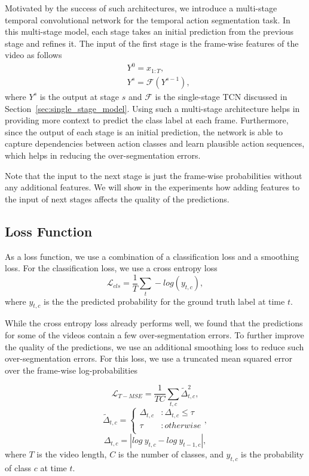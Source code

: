 \documentclass[10pt,twocolumn,letterpaper]{article}
\begin{document}
Motivated by the success of such architectures, we introduce a multi-stage 
temporal convolutional network for the temporal action segmentation
task. In this multi-stage model, each stage takes an initial prediction from 
the previous stage and refines it. The input of the first stage is the 
frame-wise features of the video as follows
\begin{align}
& Y^0 = x_{1:T}, \\
& Y^s = \mathcal{F}(Y^{s-1}), 
\end{align}
where $Y^s$ is the output at stage $s$ and $\mathcal{F}$ is the single-stage TCN 
discussed in Section~\ref{sec:single_stage_model}. Using such a multi-stage 
architecture helps in providing more context to predict the class label at each 
frame. Furthermore, since the output of each stage is an initial prediction, 
the network is able to capture dependencies between action classes and learn 
plausible action sequences, which helps in reducing the over-segmentation errors.

Note that the input to the next stage is just the frame-wise probabilities without 
any additional features. We will show in the experiments how adding features to the 
input of next stages affects the quality of the predictions.


\subsection{Loss Function}
\label{sec:loss_function}

As a loss function, we use a combination of a classification loss and a smoothing 
loss. For the classification loss, we use a cross entropy loss
\begin{equation}
\mathcal{L}_{cls} = \frac{1}{T}\sum_{t} -log(y_{t,c}), 
\end{equation}
where $y_{t,c}$ is the the predicted probability for the ground truth 
label at time $t$.

While the cross entropy loss already performs well, we found that the predictions 
for some of the videos contain a few over-segmentation errors. To further improve 
the quality of the predictions, we use an additional smoothing loss to reduce such 
over-segmentation errors. For this loss, we use a truncated mean squared error over 
the frame-wise log-probabilities

\begin{equation}\label{eqn:t_mse}
\mathcal{L}_{T-MSE} = \frac{1}{TC}\sum_{t,c}\tilde{\Delta}_{t,c}^2, 
\end{equation}
\begin{equation}
\tilde{\Delta}_{t,c} = 
\begin{cases}
\Delta_{t,c}        &: \Delta_{t,c} \leq \tau\\
\tau                &: otherwise\\
\end{cases}, 
\end{equation}
\begin{equation}
\Delta_{t,c} = \left| log\ y_{t,c} - log\ y_{t-1,c} \right|,
\end{equation}
where $T$ is the video length, $C$ is the number of classes, and $y_{t,c}$ 
is the probability of class $c$ at time $t$. 
\end{document}
